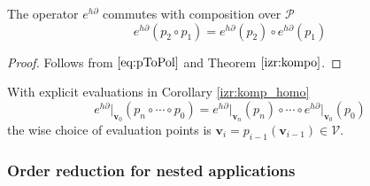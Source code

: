 \documentclass[smallcondensed]{svjour3}
\newcommand{\VV}{\mathcal{V}}
\newcommand{\vv}{\mathbf{v}}
\newcommand{\dP}{\mathcal{P}}
\newcommand{\D}{\partial}
\begin{document}
   \begin{corollary}\label{izr:komp_homo}
   The operator $e^{h\D}$ commutes with composition over $\dP$
   \begin{equation}
   e^{h\D}(p_2\circ p_1)=e^{h\D}(p_2)\circ e^{h\D}(p_1)
   \end{equation}
   \end{corollary}
   
   \begin{proof}
   Follows from $\eqref{eq:pToPol}$ and Theorem $\ref{izr:kompo}$.
   \end{proof}
   
   \begin{remark}
   With explicit evaluations in Corollary \ref{izr:komp_homo}
   \begin{equation}
   e^{h\D}\vert_{\vv_0}(p_n\circ\cdots\circ p_0)=e^{h\D}\vert_{\vv_n}(p_n)\circ\cdots\circ e^{h\D}\vert_{\vv_0}(p_0)
   \end{equation}
   the wise choice of evaluation points is $\vv_{i}=p_{i-1}(\vv_{i-1})\in \VV$.
   \end{remark}
 
 \subsubsection{Order reduction for nested applications}\label{sec:orderReduction}
 
\end{document}
